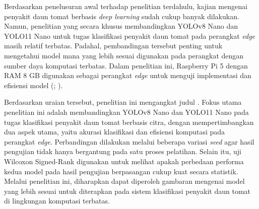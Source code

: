 \begin{sectioncontent}
    Berdasarkan penelusuran awal terhadap penelitian terdahulu, kajian mengenai penyakit daun tomat berbasis \textit{deep learning} sudah cukup banyak dilakukan. Namun, penelitian yang secara khusus membandingkan YOLOv8 Nano dan YOLO11 Nano untuk tugas klasifikasi penyakit daun tomat pada perangkat \textit{edge} masih relatif terbatas. Padahal, pembandingan tersebut penting untuk mengetahui model mana yang lebih sesuai digunakan pada perangkat dengan sumber daya komputasi terbatas. Dalam penelitian ini, Raspberry Pi 5 dengan RAM 8 GB digunakan sebagai perangkat \textit{edge} untuk menguji implementasi dan efisiensi model (\citealp[bagian \textit{Specifications}]{raspberrypi5}; \citealp[hlm. 2--3]{raspberrypi5brief}).

    Berdasarkan uraian tersebut, penelitian ini mengangkat judul \textbf{\judulid}. Fokus utama penelitian ini adalah membandingkan YOLOv8 Nano dan YOLO11 Nano pada tugas klasifikasi penyakit daun tomat berbasis citra, dengan mempertimbangkan dua aspek utama, yaitu akurasi klasifikasi dan efisiensi komputasi pada perangkat \textit{edge}. Perbandingan dilakukan melalui beberapa variasi \textit{seed} agar hasil pengujian tidak hanya bergantung pada satu proses pelatihan. Selain itu, uji Wilcoxon Signed-Rank digunakan untuk melihat apakah perbedaan performa kedua model pada hasil pengujian berpasangan cukup kuat secara statistik. Melalui penelitian ini, diharapkan dapat diperoleh gambaran mengenai model yang lebih sesuai untuk diterapkan pada sistem klasifikasi penyakit daun tomat di lingkungan komputasi terbatas.
\end{sectioncontent}

